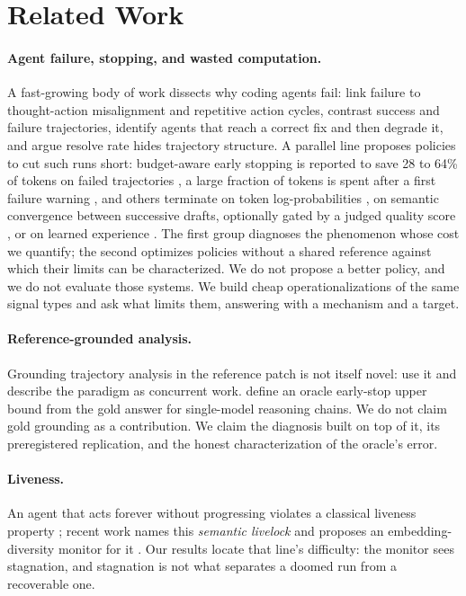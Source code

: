 \documentclass[sigconf,screen]{acmart}
\begin{document}
\section{Related Work}
\paragraph{Agent failure, stopping, and wasted computation.}
A fast-growing body of work dissects why coding agents fail: \citet{bouzenia2025understanding} link
failure to thought-action misalignment and repetitive action cycles,
\citet{understandingcodeagent2025} contrast success and failure trajectories,
\citet{coherencecollapse2026} identify agents that reach a correct fix and then degrade it, and
\citet{resolveratehides2026} argue resolve rate hides trajectory structure. A parallel line
proposes policies to cut such runs short: budget-aware early stopping is reported to save 28 to
64\% of tokens on failed trajectories \cite{bagen2026}, a large fraction of tokens
is spent after a first failure warning \cite{earlydiagnosis2026}, and others terminate on token
log-probabilities \cite{agentstop2026}, on semantic convergence between successive drafts,
optionally gated by a judged quality score \cite{shp2026}, or on learned experience \cite{eet2026}. The first group diagnoses the phenomenon
whose cost we quantify; the second optimizes policies without a shared reference against which
their limits can be characterized. We do not propose a better policy, and we do not evaluate those
systems. We build cheap operationalizations of the same signal types and ask what limits them,
answering with a mechanism and a target.

\paragraph{Reference-grounded analysis.}
Grounding trajectory analysis in the reference patch is not itself novel:
\citet{coherencecollapse2026} use it and describe the paradigm as concurrent work.
\citet{beyondaccuracy2026} define an oracle early-stop upper bound from the gold answer for
single-model reasoning chains. We do not claim gold grounding as a contribution. We claim the
diagnosis built on top of it, its preregistered replication, and the honest characterization of the
oracle's error.

\paragraph{Liveness.}
An agent that acts forever without progressing violates a classical liveness property
\cite{lamport1977proving, alpern1985defining}; recent work names this \emph{semantic livelock} and
proposes an embedding-diversity monitor for it \cite{zombieagents2026}. Our results locate that
line's difficulty: the monitor sees stagnation, and stagnation is not what separates a doomed run
from a recoverable one.
\end{document}
